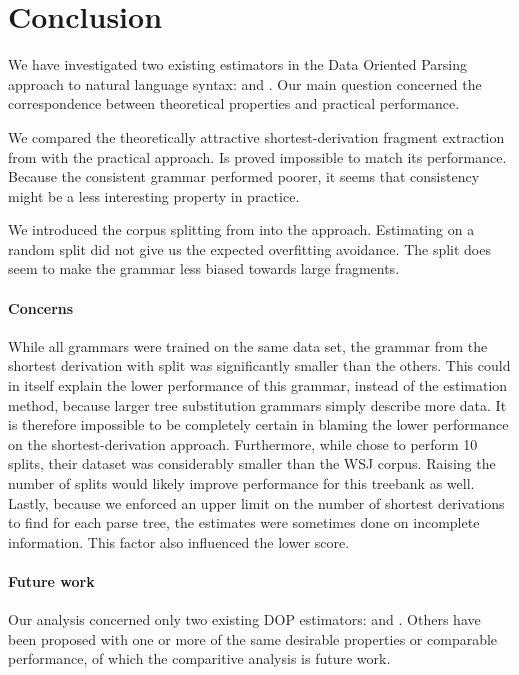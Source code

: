 \section{Conclusion}

We have investigated two existing estimators in the Data Oriented Parsing approach to natural language syntax: \ddop{} and \dops. Our main question concerned the correspondence between theoretical properties and practical performance. 

We compared the theoretically attractive shortest-derivation fragment extraction from \dops{} with the practical \ddop{} approach. Is proved impossible to match its performance. Because the consistent grammar performed poorer, it seems that consistency might be a less interesting property in practice.

We introduced the corpus splitting from \dops{} into the \ddop{} approach. Estimating on a random split did not give us the expected overfitting avoidance. The split does seem to make the grammar less biased towards large fragments. 

\paragraph{Concerns}
While all grammars were trained on the same data set, the grammar from the shortest derivation with split was significantly smaller than the others. This could in itself explain the lower performance of this grammar, instead of the estimation method, because larger tree substitution grammars simply describe more data. It is therefore impossible to be completely certain in blaming the lower performance on the shortest-derivation approach.
Furthermore, while \cite{zollman2005} chose to perform 10 splits, their dataset was considerably smaller than the WSJ corpus. Raising the number of splits would likely improve performance for this treebank as well.
Lastly, because we enforced an upper limit on the number of shortest derivations to find for each parse tree, the estimates were sometimes done on incomplete information. This factor also influenced the lower score.


\paragraph{Future work}
Our analysis concerned only two existing DOP estimators: \ddop{} and \dops{}. Others have been proposed with one or more of the same desirable properties or comparable performance, of which the comparitive analysis is future work.

